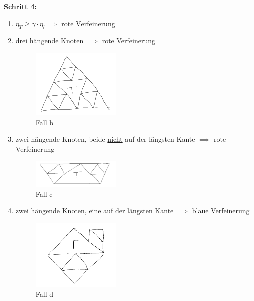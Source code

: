 \textbf{Schritt 4:}
\begin{enumerate}[label=\alph*)]
	\item $\eta_T\geq\gamma\cdot\eta_l\implies\text{ rote Verfeinerung}$
	\item drei hängende Knoten $\implies$ rote Verfeinerung
	\begin{figure}[!ht]
		\begin{center}
			\includegraphics[width=0.4\textwidth]{pics/Sketch11.png}
			\caption{Fall b}
			\label{AbbVerfeinerungB}
		\end{center}
	\end{figure}
	\item zwei hängende Knoten, beide \underline{nicht} auf der längsten Kante $\implies$ rote Verfeinerung
	\begin{figure}[!ht]
		\begin{center}
			\includegraphics[width=0.4\textwidth]{pics/Sketch12.png}
			\caption{Fall c}
			\label{AbbVerfeinerungC}
		\end{center}
	\end{figure}
	\item zwei hängende Knoten, eine auf der längsten Kante $\implies$ blaue Verfeinerung
	\begin{figure}[!ht]
		\begin{center}
			\includegraphics[width=0.4\textwidth]{pics/Sketch13.png}
			\caption{Fall d}
			\label{AbbVerfeinerungD}
		\end{center}

\end{figure}
\end{enumerate}
